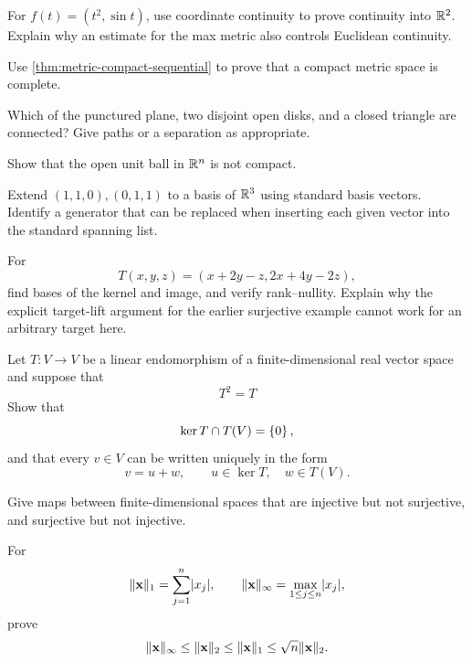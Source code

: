 \begin{exercise}
For $f(t)=(t^2,\sin t)$, use coordinate continuity to prove continuity
into $\mathbb{R}^2$. Explain why an estimate for the max metric also controls
Euclidean continuity.
\end{exercise}


\begin{exercise}
Use \cref{thm:metric-compact-sequential} to prove that a compact metric space
is complete.
\end{exercise}

\begin{exercise}
Which of the punctured plane, two disjoint open disks, and a closed
triangle are connected? Give paths or a separation as appropriate.
\end{exercise}

\begin{exercise}
Show that the open unit ball in $\mathbb{R}^n$ is not compact.
\end{exercise}

\begin{exercise}
Extend $(1,1,0),(0,1,1)$ to a basis of $\mathbb{R}^3$ using standard basis
vectors. Identify a generator that can be replaced when inserting each
given vector into the standard spanning list.
\end{exercise}

\begin{exercise}
For
\[
T(x,y,z)=(x+2y-z,2x+4y-2z),
\]
find bases of the kernel and image, and verify rank--nullity. Explain why
the explicit target-lift argument for the earlier surjective example cannot
work for an arbitrary target here.
\end{exercise}

\begin{exercise}
Let \(T:V\to V\) be a linear endomorphism of a finite-dimensional real vector
space and suppose that
\[
T^2=T
\]
Show that
\[
\ker T\cap T(V)=\left\{0\right\},
\]
and that every \(v\in V\) can be written uniquely in the form
\[
v=u+w,
\qquad
u\in\ker T,\quad w\in T(V).
\]
\end{exercise}

\begin{exercise}
Give maps between finite-dimensional spaces that are injective but not
surjective, and surjective but not injective.
\end{exercise}

\begin{exercise}
For
\[
\lVert \mathbf{x}\rVert_1=\sum_{j=1}^{n}\lvert x_j\rvert,
\qquad
\lVert \mathbf{x}\rVert_\infty=\max_{1\leq j\leq n}\lvert x_j\rvert,
\]
prove
\[
\lVert \mathbf{x}\rVert_\infty\leq\lVert \mathbf{x}\rVert_2\leq\lVert \mathbf{x}\rVert_1
\leq\sqrt n\lVert \mathbf{x}\rVert_2.
\]
\end{exercise}

